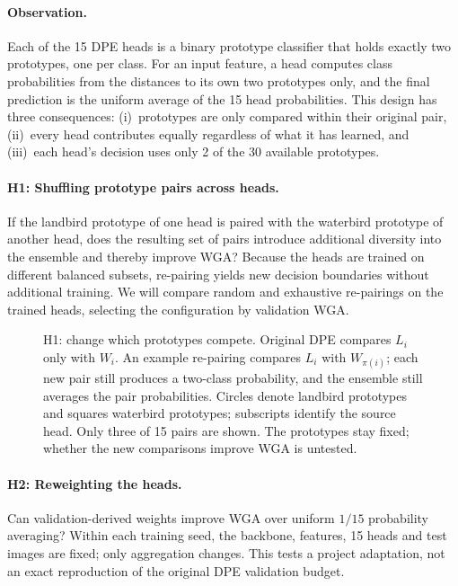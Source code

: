 \documentclass[runningheads]{llncs}
\begin{document}
\paragraph{Observation.} Each of the 15 DPE heads is a binary prototype classifier that holds exactly two prototypes, one per class. For an input feature, a head computes class probabilities from the distances to its own two prototypes only, and the final prediction is the uniform average of the 15 head probabilities. This design has three consequences: (i)~prototypes are only compared within their original pair, (ii)~every head contributes equally regardless of what it has learned, and (iii)~each head's decision uses only 2 of the 30 available prototypes.

\paragraph{H1: Shuffling prototype pairs across heads.} If the landbird prototype of one head is paired with the waterbird prototype of another head, does the resulting set of pairs introduce additional diversity into the ensemble and thereby improve WGA? Because the heads are trained on different balanced subsets, re-pairing yields new decision boundaries without additional training. We will compare random and exhaustive re-pairings on the trained heads, selecting the configuration by validation WGA.

\begin{figure}[H]
\centering

\caption{H1: change which prototypes compete. Original DPE compares $L_i$ only with $W_i$. An example re-pairing compares $L_i$ with $W_{\pi(i)}$; each new pair still produces a two-class probability, and the ensemble still averages the pair probabilities. Circles denote landbird prototypes and squares waterbird prototypes; subscripts identify the source head. Only three of 15 pairs are shown. The prototypes stay fixed; whether the new comparisons improve WGA is untested.}
\label{fig:dpe-h1}
\end{figure}

\paragraph{H2: Reweighting the heads.}
Can validation-derived weights improve WGA over uniform $1/15$ probability averaging? Within each training seed, the backbone, features, 15 heads and test images are fixed; only aggregation changes. This tests a project adaptation, not an exact reproduction of the original DPE validation budget.
\end{document}
